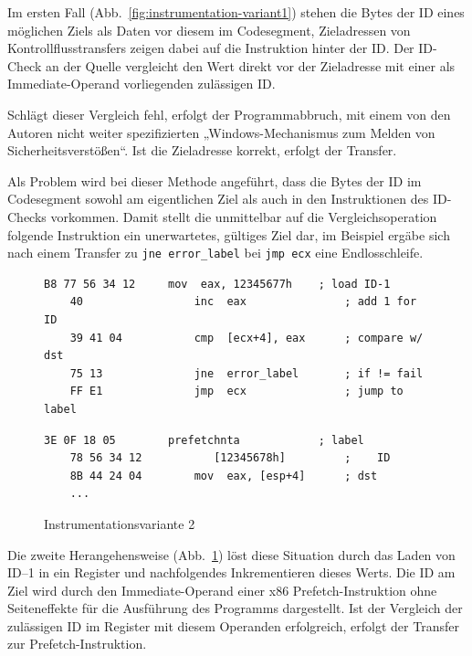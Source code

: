 \documentclass[11pt]{article}
\begin{document}
Im ersten Fall (Abb.~\ref{fig:instrumentation-variant1}) stehen die Bytes der ID
eines möglichen Ziels als Daten vor diesem im Codesegment, Zieladressen von
Kontrollflusstransfers zeigen dabei auf die Instruktion hinter der ID. Der
ID-Check an der Quelle vergleicht den Wert direkt vor der Zieladresse mit einer
als Immediate-Operand vorliegenden zulässigen ID.

Schlägt dieser Vergleich fehl, erfolgt der Programmabbruch, mit einem von den
Autoren nicht weiter spezifizierten „Windows-Mechanismus zum Melden von
Sicherheitsverstößen“. Ist die Zieladresse korrekt, erfolgt der Transfer.

\label{instrumentation-variant1}

Als Problem wird bei dieser Methode angeführt,
dass die Bytes der ID im Codesegment sowohl am eigentlichen Ziel als auch in
den Instruktionen des ID-Checks vorkommen. Damit stellt die unmittelbar auf die
Vergleichsoperation folgende Instruktion ein unerwartetes, gültiges Ziel dar,
im Beispiel ergäbe sich nach einem Transfer zu \texttt{jne error\_label} bei
\texttt{jmp ecx} eine Endlosschleife.

\begin{figure}
  \begin{lstlisting}[title=Quelle]
    B8 77 56 34 12     mov  eax, 12345677h    ; load ID-1
    40                 inc  eax               ; add 1 for ID
    39 41 04           cmp  [ecx+4], eax      ; compare w/ dst
    75 13              jne  error_label       ; if != fail
    FF E1              jmp  ecx               ; jump to label
  \end{lstlisting}

  \begin{lstlisting}[title=Ziel]
    3E 0F 18 05        prefetchnta            ; label
    78 56 34 12           [12345678h]         ;    ID
    8B 44 24 04        mov  eax, [esp+4]      ; dst
    ...
  \end{lstlisting}

  \caption{Instrumentationsvariante 2}
  \label{fig:instrumentation-variant2}
\end{figure}

\label{instrumentation-variant2}

Die zweite Herangehensweise (Abb.~\ref{fig:instrumentation-variant2}) löst diese
Situation durch das Laden von ID–1 in ein Register und nachfolgendes
Inkrementieren dieses Werts. Die ID am Ziel wird durch den Immediate-Operand
einer x86 Prefetch-Instruktion ohne Seiteneffekte für die Ausführung des
Programms dargestellt. Ist der Vergleich der zulässigen ID im Register mit
diesem Operanden erfolgreich, erfolgt der Transfer zur Prefetch-Instruktion.
\end{document}
